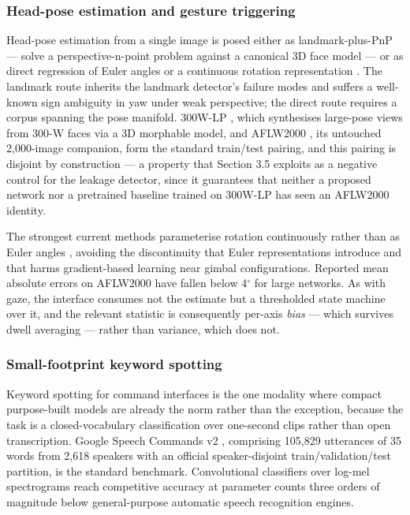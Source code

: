 \subsubsection{Head-pose estimation and gesture triggering}

Head-pose estimation from a single image is posed either as landmark-plus-PnP --- solve a perspective-n-point problem against a canonical 3D face model --- or as direct regression of Euler angles  or a continuous rotation representation . The landmark route inherits the landmark detector's failure modes and suffers a well-known sign ambiguity in yaw under weak perspective; the direct route requires a corpus spanning the pose manifold. 300W-LP , which synthesises large-pose views from 300-W faces via a 3D morphable model, and AFLW2000 , its untouched 2,000-image companion, form the standard train/test pairing, and this pairing is disjoint by construction --- a property that Section 3.5 exploits as a negative control for the leakage detector, since it guarantees that neither a proposed network nor a pretrained baseline trained on 300W-LP has seen an AFLW2000 identity.

The strongest current methods parameterise rotation continuously rather than as Euler angles , avoiding the discontinuity that Euler representations introduce and that harms gradient-based learning near gimbal configurations. Reported mean absolute errors on AFLW2000 have fallen below 4$^{\circ}$ for large networks. As with gaze, the interface consumes not the estimate but a thresholded state machine over it, and the relevant statistic is consequently per-axis \emph{bias} --- which survives dwell averaging --- rather than variance, which does not.

\subsubsection{Small-footprint keyword spotting}

Keyword spotting for command interfaces is the one modality where compact purpose-built models are already the norm rather than the exception, because the task is a closed-vocabulary classification over one-second clips rather than open transcription. Google Speech Commands v2 , comprising 105,829 utterances of 35 words from 2,618 speakers with an official speaker-disjoint train/validation/test partition, is the standard benchmark. Convolutional classifiers over log-mel spectrograms  reach competitive accuracy at parameter counts three orders of magnitude below general-purpose automatic speech recognition engines.

